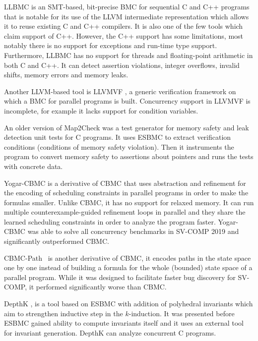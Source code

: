 LLBMC  is an SMT-based, bit-precise BMC for
sequential C and C++ programs that is notable for its use of the LLVM
intermediate representation which allows it to reuse existing C and C++
compilers.
It is also one of the few tools which claim support of C++.
However, the C++ support has some limitations, most notably there is no
support for exceptions and run-time type support.
Furthermore, LLBMC has no support for threads and floating-point arithmetic in
both C and C++.
It can detect assertion violations, integer overflows, invalid shifts, memory
errors and memory leaks.

Another LLVM-based tool is LLVMVF , a generic verification framework on which a BMC for parallel programs is built.
Concurrency support in LLVMVF is incomplete, for example it lacks support for condition variables.

An older version of Map2Check  was a test generator for memory safety and leak detection unit tests for C programs.
It uses ESBMC to extract verification conditions (conditions of memory safety violation).
Then it instruments the program to convert memory safety to assertions about pointers and runs the tests with concrete data.

Yogar-CBMC  is a derivative of CBMC that uses
abstraction and refinement for the encoding of scheduling constraints in
parallel programs in order to make the formulas smaller.
Unlike CBMC, it has no support for relaxed memory.
It can run multiple counterexample-guided refinement loops in parallel and they
share the learned scheduling constraints in order to analyze the program
faster.
Yogar-CBMC was able to solve all concurrency benchmarks in SV-COMP 2019 and significantly outperformed CBMC.

CBMC-Path~ is another derivative of CBMC, it encodes paths in
the state space one by one instead of building a formula for the whole
(bounded) state space of a parallel program.
While it was designed to facilitate faster bug discovery for SV-COMP, it performed significantly worse than CBMC.

DepthK , is a tool based on ESBMC with
addition of polyhedral invariants which aim to strengthen inductive step in the
$k$-induction.
It was presented before ESBMC gained ability to compute invariants itself and it uses an external tool for invariant generation.
DepthK can analyze concurrent C programs.

